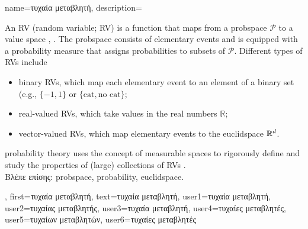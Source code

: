 
{name={\foreignlanguage{greek}{τυχαία μεταβλητή}},
 description={An RV (random variable; RV) is a function that maps from 
 	a \gls{probspace} $\mathcal{P}$ to a value space \cite{GrayProbBook}, \cite{BillingsleyProbMeasure}. 
 	The \gls{probspace} consists of elementary events and is equipped with a \gls{probability} 
 	measure that assigns probabilities to subsets of $\mathcal{P}$. 
 	Different types of RVs include  
 	\begin{itemize} 
 	\item {binary RVs}, which map each elementary event to an element of a binary set (e.g., $\{-1,1\}$ or $\{\text{cat}, \text{no cat}\}$; 
 	\item {real-valued RVs}, which take values in the real numbers $\mathbb{R}$;  
 	\item {vector-valued RVs}, which map elementary events to the \gls{euclidspace} $\mathbb{R}^{d}$.  
 	\end{itemize} 
 	\Gls{probability} theory uses the concept of measurable spaces to rigorously define 
 	and study the properties of (large) collections of RVs \cite{BillingsleyProbMeasure}.\\
	\foreignlanguage{greek}{Βλέπε επίσης:} \gls{probspace}, \gls{probability}, \gls{euclidspace}.
	}, first={\foreignlanguage{greek}{τυχαία μεταβλητή}},
	text={\foreignlanguage{greek}{τυχαία μεταβλητή}},
	user1={\foreignlanguage{greek}{τυχαία μεταβλητή}}, %
	user2={\foreignlanguage{greek}{τυχαίας μεταβλητής}}, %
	user3={\foreignlanguage{greek}{τυχαία μεταβλητή}}, %
	user4={\foreignlanguage{greek}{τυχαίες μεταβλητές}}, %
	user5={\foreignlanguage{greek}{τυχαίων μεταβλητών}}, %
	user6={\foreignlanguage{greek}{τυχαίες μεταβλητές}} %
}


